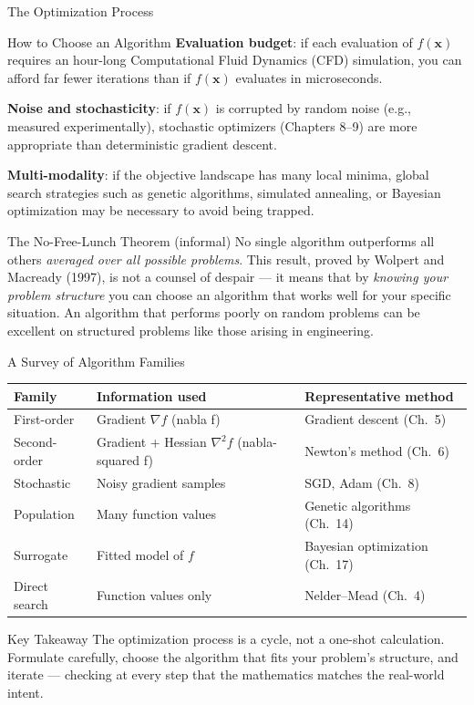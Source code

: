\documentclass[aspectratio=169,10pt]{beamer}
\newcommand{\vx}{\mathbf{x}}
\newcommand{\grad}{\nabla}
\newcommand{\hess}{\nabla^2}
\begin{document}
\begin{frame}[allowframebreaks]{The Optimization Process}
\begin{block}{How to Choose an Algorithm}
    \medskip
    \textbf{Evaluation budget}: if each evaluation of $f(\vx)$ requires an
    hour-long Computational Fluid Dynamics (CFD) simulation, you can afford far
    fewer iterations than if $f(\vx)$ evaluates in microseconds.

    \medskip
    \textbf{Noise and stochasticity}: if $f(\vx)$ is corrupted by random noise
    (e.g., measured experimentally), stochastic optimizers (Chapters 8--9) are
    more appropriate than deterministic gradient descent.

    \medskip
    \textbf{Multi-modality}: if the objective landscape has many local minima,
    global search strategies such as genetic algorithms, simulated annealing, or
    Bayesian optimization may be necessary to avoid being trapped.
  \end{block}

  \begin{exampleblock}{The No-Free-Lunch Theorem (informal)}
    No single algorithm outperforms all others \emph{averaged over all possible
    problems}.  This result, proved by Wolpert and Macready (1997), is not a
    counsel of despair --- it means that by \emph{knowing your problem structure}
    you can choose an algorithm that works well for your specific situation.
    An algorithm that performs poorly on random problems can be excellent on
    structured problems like those arising in engineering.
  \end{exampleblock}

  \begin{block}{A Survey of Algorithm Families}
    \centering
    \begin{tabular}{lll}
      \toprule
      \textbf{Family} & \textbf{Information used} & \textbf{Representative method} \\
      \midrule
      First-order  & Gradient $\grad f$ (nabla f) & Gradient descent (Ch.\ 5) \\
      Second-order & Gradient + Hessian $\hess f$ (nabla-squared f) & Newton's method (Ch.\ 6) \\
      Stochastic   & Noisy gradient samples & SGD, Adam (Ch.\ 8) \\
      Population   & Many function values & Genetic algorithms (Ch.\ 14) \\
      Surrogate    & Fitted model of $f$ & Bayesian optimization (Ch.\ 17) \\
      Direct search & Function values only & Nelder--Mead (Ch.\ 4) \\
      \bottomrule
    \end{tabular}
  \end{block}

  \begin{alertblock}{Key Takeaway}
    The optimization process is a cycle, not a one-shot calculation.
    Formulate carefully, choose the algorithm that fits your problem's structure,
    and iterate --- checking at every step that the mathematics matches
    the real-world intent.
  \end{alertblock}

\end{frame}
\end{document}
